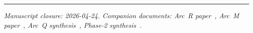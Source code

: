 \documentclass[11pt,a4paper]{article}
\begin{document}
\vspace{1em}
\noindent\rule{\linewidth}{0.4pt}
\vspace{0.2em}

\noindent\emph{Manuscript closure: 2026-04-24. Companion documents: Arc~R paper~\cite{arcr}, Arc~M paper~\cite{arcm}, Arc~Q synthesis~\cite{qsynth}, Phase-2 synthesis~\cite{p2synth}.}
\end{document}
